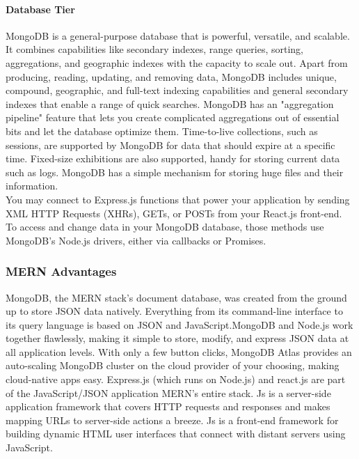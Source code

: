 \documentclass[a4paper, 11pt]{report}
\begin{document}
\paragraph{Database Tier}
MongoDB is a general-purpose database that is powerful, versatile, and scalable. It combines capabilities like secondary indexes, range queries, sorting, aggregations, and geographic indexes with the capacity to scale out. \cite{(MongoDB, n.d.)} Apart from producing, reading, updating, and removing data, MongoDB includes unique, compound, geographic, and full-text indexing capabilities and general secondary indexes that enable a range of quick searches. MongoDB has an "aggregation pipeline" feature that lets you create complicated aggregations out of essential bits and let the database optimize them. Time-to-live collections, such as sessions, are supported by MongoDB for data that should expire at a specific time. Fixed-size exhibitions are also supported, handy for storing current data such as logs. MongoDB has a simple mechanism for storing huge files and their information. \cite{(Bradshaw, Chodorow, & Eoin Brazil, 2019)}\\

You may connect to Express.js functions that power your application by sending XML HTTP Requests (XHRs), GETs, or POSTs from your React.js front-end. To access and change data in your MongoDB database, those methods use MongoDB's Node.js drivers, either via callbacks or Promises. \cite{(MongoDB, n.d.)}

\subsubsection{MERN Advantages}
MongoDB, the MERN stack's document database, was created from the ground up to store JSON data natively. Everything from its command-line interface to its query language is based on JSON and JavaScript.MongoDB and Node.js work together flawlessly, making it simple to store, modify, and express JSON data at all application levels. With only a few button clicks, MongoDB Atlas provides an auto-scaling MongoDB cluster on the cloud provider of your choosing, making cloud-native apps easy. Express.js (which runs on Node.js) and react.js are part of the JavaScript/JSON application MERN's entire stack. Js is a server-side application framework that covers HTTP requests and responses and makes mapping URLs to server-side actions a breeze. Js is a front-end framework for building dynamic HTML user interfaces that connect with distant servers using JavaScript.\\
\end{document}
